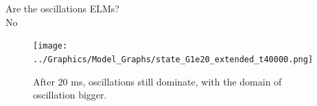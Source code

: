 \documentclass[10pt]{beamer}
\begin{document}
\begin{frame}
\centering
Are the oscillations ELMs? \\
\Huge No
\end{frame}

\begin{frame} %

\begin{figure}[h]
\begin{minipage}{0.69\linewidth}
	\texttt{[image: ../Graphics/Model\_Graphs/state\_G1e20\_extended\_t40000.png]}
\end{minipage}
\begin{minipage}{0.29\linewidth}
	\caption{After 20 ms, oscillations still dominate, with the domain of oscillation bigger.}
\end{minipage}
\end{figure}

\end{frame}
\end{document}
